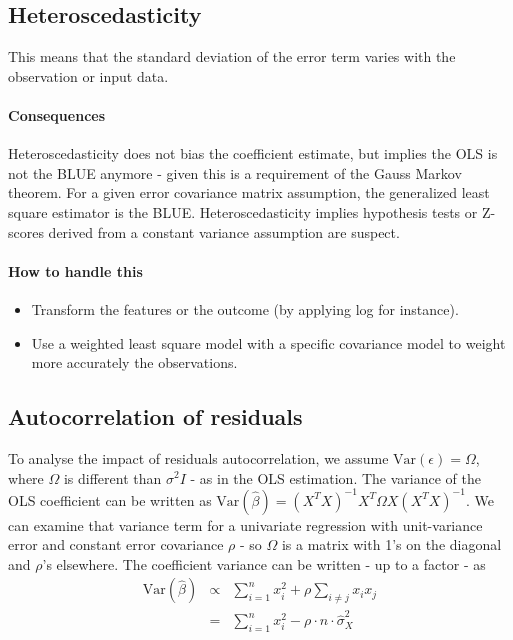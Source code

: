 \documentclass[]{article}
\begin{document}
\subsection{Heteroscedasticity}

This means that the standard deviation of the error term varies with the observation or input data.

\paragraph{Consequences} Heteroscedasticity does not bias the coefficient estimate, but implies the OLS is not the BLUE anymore - given this is a requirement of the Gauss Markov theorem. For a given error covariance matrix assumption, the generalized least square estimator is the BLUE. Heteroscedasticity implies hypothesis tests or Z-scores derived from a constant variance assumption are suspect.

\paragraph{How to handle this} 
\begin{itemize}
\item Transform the features or the outcome (by applying log for instance).
\item Use a weighted least square model with a specific covariance model to weight more accurately the observations.
\end{itemize}

\subsection{Autocorrelation of residuals}

To analyse the impact of residuals autocorrelation, we assume $\mathrm{Var}(\epsilon)=\Omega$, where $\Omega$ is different than $\sigma^2 I$ - as in the OLS estimation. The variance of the OLS coefficient can be written as $\mathrm{Var}(\hat{\beta})=(X^TX)^{-1}X^T \Omega X (X^TX)^{-1}$. We can examine that variance term for a univariate regression with unit-variance error and constant error covariance $\rho$ - so $\Omega$ is a matrix with 1's on the diagonal and $\rho$'s elsewhere. The coefficient variance can be written - up to a factor - as
\begin{eqnarray}
\mathrm{Var}(\hat{\beta}) &\propto& \sum_{i=1}^n x_i^2 + \rho \sum_{i\neq j} x_i x_j \\
&=& \sum_{i=1}^n x_i^2 - \rho \cdot n \cdot \hat{\sigma}_X^2
\end{eqnarray}
\end{document}
